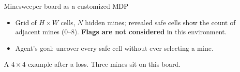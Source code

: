 
\begin{frame}{Minesweeper board as a customized MDP}
  \begin{itemize}
    \item Grid of $H \times W$ cells, $N$ hidden mines; revealed safe cells
          show the count of adjacent mines ($0$–$8$). \textbf{Flags are not considered} in this environment.
    \item Agent's goal: uncover every safe cell without ever selecting a mine.
  \end{itemize}

  \centering

  \vspace{0.1cm}
   \qquad
   \qquad

  \vspace{0.1cm}
  \small A $4\times4$ example after a loss. Three mines sit on this board.
\end{frame}

